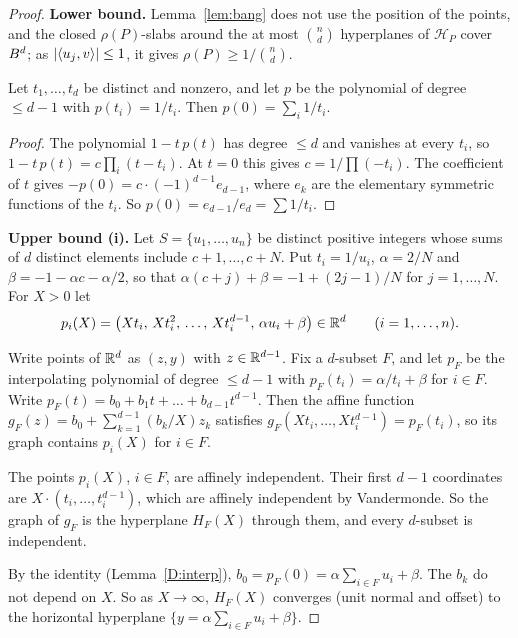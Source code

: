 \documentclass[11pt]{article}
\begin{document}
\begin{proof}
\textbf{Lower bound.} Lemma~\ref{lem:bang} does not use the position of the points, and the closed
$\rho(P)$-slabs around the at most $\binom nd$ hyperplanes of $\mathcal H_P$ cover $B^d$; as
$\left|\langle u_j,v\rangle\right|\le1$, it gives $\rho(P)\ge1/\binom{n}{d}$.

\begin{lemma}\label{D:interp}
Let $t_1,\dots,t_d$ be distinct and nonzero, and let $p$ be the polynomial of degree $\le d-1$ with
$p(t_i)=1/t_i$. Then $p(0)=\sum_i1/t_i$.
\end{lemma}

\begin{proof}
The polynomial $1-t\,p(t)$ has degree $\le d$ and vanishes at every $t_i$, so
$1-t\,p(t)=c\prod_i(t-t_i)$. At $t=0$ this gives $c=1/\prod(-t_i)$. The coefficient of $t$ gives
$-p(0)=c\cdot(-1)^{d-1}e_{d-1}$, where $e_k$ are the elementary symmetric functions of the $t_i$. So
$p(0)=e_{d-1}/e_d=\sum1/t_i$.
\end{proof}

\textbf{Upper bound (i).} Let $S=\{u_1,\dots,u_n\}$ be distinct positive integers whose
sums of $d$ distinct elements include $c+1,\dots,c+N$. Put $t_i=1/u_i$, $\alpha=2/N$ and
$\beta=-1-\alpha c-\alpha/2$, so that $\alpha(c+j)+\beta=-1+(2j-1)/N$ for $j=1,\dots,N$. For $X>0$
let
\begin{equation*}
  p_i(X)=\bigl(Xt_i,\,Xt_i^2,\,\dots,\,Xt_i^{d-1},\,\alpha u_i+\beta\bigr)\in\mathbb{R}^d\qquad(i=1,\dots,n).
\end{equation*}

Write points of $\mathbb{R}^d$ as $(z,y)$ with $z\in\mathbb{R}^{d-1}$. Fix a $d$-subset $F$, and let $p_F$ be the
interpolating polynomial of degree $\le d-1$ with $p_F(t_i)=\alpha/t_i+\beta$ for $i\in F$. Write
$p_F(t)=b_0+b_1t+\dots+b_{d-1}t^{d-1}$. Then the affine function
$g_F(z)=b_0+\sum_{k=1}^{d-1}(b_k/X)z_k$ satisfies $g_F(Xt_i,\dots,Xt_i^{d-1})=p_F(t_i)$, so its
graph contains $p_i(X)$ for $i\in F$.

The points $p_i(X)$, $i\in F$, are affinely independent. Their first $d-1$ coordinates are
$X\cdot(t_i,\dots,t_i^{d-1})$, which are affinely independent by Vandermonde. So the graph of $g_F$
is the hyperplane $H_F(X)$ through them, and every $d$-subset is independent.

By the identity (Lemma~\ref{D:interp}), $b_0=p_F(0)=\alpha\sum_{i\in F}u_i+\beta$. The $b_k$ do not
depend on $X$. So as $X\to\infty$, $H_F(X)$ converges (unit normal and offset) to the horizontal
hyperplane $\{y=\alpha\sum_{i\in F}u_i+\beta\}$.


\end{proof}
\end{document}
